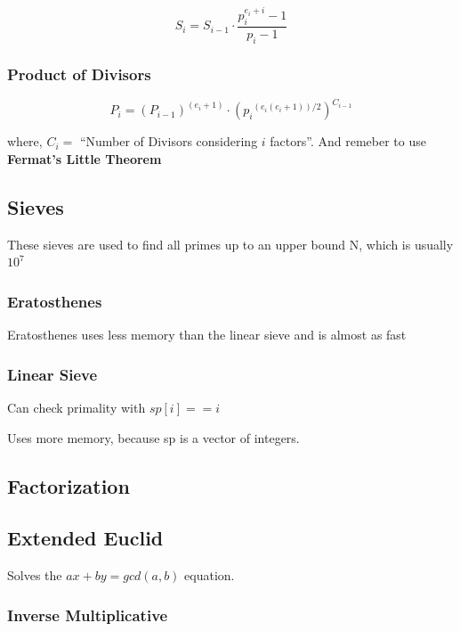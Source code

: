 	$$ S_i = S_{i-1} \cdot \frac{p_i^{e_i + i} - 1}{p_i - 1} $$
	
	\subsubsection{Product of Divisors}
	
	$$ P_i = (P_{i-1})^{(e_i + 1)} \cdot ({p_i}^{(e_i(e_i + 1))/2})^{C_{i-1}} $$
	
	where, $ C_i = $ ``Number of Divisors considering $i$ factors''.
	And remeber to use \textbf{Fermat's Little Theorem}
	
\subsection{Sieves}
	
	These sieves are used to find all primes up to an upper bound N, which is usually $10^7$

	\subsubsection{Eratosthenes}

		Eratosthenes uses less memory than the linear sieve and is almost as fast


	\subsubsection{Linear Sieve}

		Can check primality with $sp[i] == i$

		Uses more memory, because sp is a vector of integers.


\subsection{Factorization}


\subsection{Extended Euclid}
	
	Solves the $ ax + by = gcd(a, b)$ equation.

	\subsubsection{Inverse Multiplicative}

